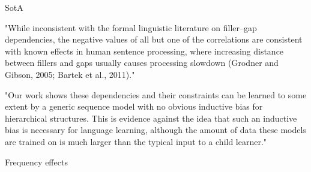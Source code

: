 SotA


"While inconsistent with the formal linguistic literature on filler–gap dependencies, the negative values of all but one of the correlations are consistent with known effects in human sentence processing, where increasing distance between fillers
and gaps usually causes processing slowdown (Grodner and Gibson, 2005; Bartek et al., 2011)."  \citep{wilcox2018rnn}

"Our work shows these dependencies and their constraints can be learned to some extent by a generic sequence model with no obvious inductive bias for hierarchical structures. This is evidence against the idea that such an inductive bias is necessary for language learning, although the amount of data these models are trained on is much larger
than the typical input to a child learner." \citep{wilcox2018rnn}


Frequency effects



